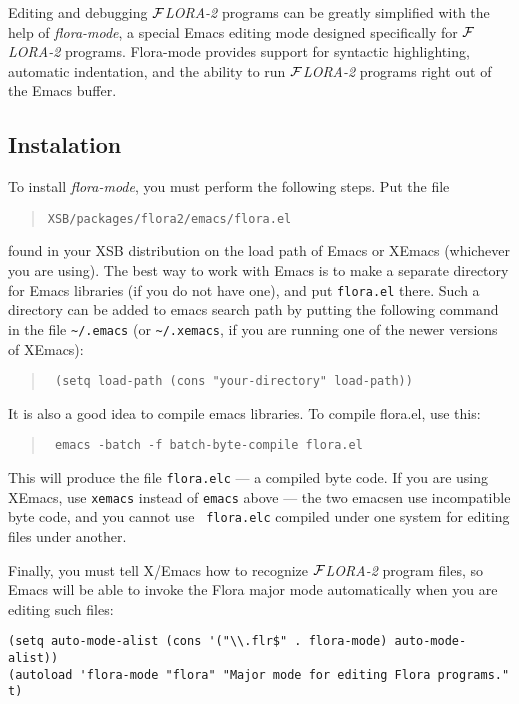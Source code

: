 \documentclass[11pt]{article}
\newcommand{\FLORA}{{\mbox{${\cal F}${\small\it LORA}\rm\emph{-2}}}\xspace}
\begin{document}
Editing and debugging \FLORA programs can be greatly simplified with the
help of \emph{flora-mode}, a special Emacs editing mode designed
specifically for \FLORA programs. Flora-mode provides support for syntactic
highlighting, automatic indentation, and the ability to run \FLORA programs
right out of the Emacs buffer.


\subsection{Instalation}


To install \emph{flora-mode}, you must perform the following steps. Put the
file
\begin{quote}
  {\tt XSB/packages/flora2/emacs/flora.el} 
\end{quote}
found in your XSB distribution on the load path of Emacs or XEmacs
(whichever you are using). The best way to work with Emacs is to make a
separate directory for Emacs libraries (if you do not have one), and put
{\tt flora.el} there. Such a directory can be added to emacs search path by
putting the following command in the file \verb|~/.emacs| (or
\verb|~/.xemacs|, if you are running one of the newer versions of XEmacs):
\begin{quote}
  \tt
   (setq load-path (cons "your-directory" load-path)) 
\end{quote}
It is also a good idea to compile emacs libraries. To compile flora.el,
use this:
\begin{quote}
  \tt
   emacs -batch -f batch-byte-compile flora.el 
\end{quote}
This will produce the file {\tt flora.elc} --- a compiled byte code.
If you are using XEmacs, use {\tt xemacs} instead of {\tt emacs} above ---
the two emacsen use incompatible byte code, and you cannot use {\tt
  flora.elc} compiled under one system for editing files under another.

Finally, you must tell X/Emacs how to recognize \FLORA program files, so
Emacs will be able to invoke the Flora major mode automatically when you
are editing such files:
\begin{verbatim}
(setq auto-mode-alist (cons '("\\.flr$" . flora-mode) auto-mode-alist))
(autoload 'flora-mode "flora" "Major mode for editing Flora programs." t)
\end{verbatim}
\end{document}
